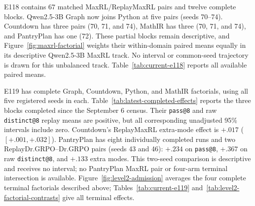 \documentclass{article}
\newcommand{\1}{\mathbf 1}
\theoremstyle{remark}
\theoremstyle{definition}
\theoremstyle{plain}
\begin{document}
E118 contains 67 matched MaxRL/ReplayMaxRL pairs and twelve complete
blocks. Qwen2.5-3B Graph now joins Python at five pairs (seeds 70--74).
Countdown has three pairs (70, 71, and 74), MathIR has three (70, 71, and 74),
and PantryPlan has one (72). These partial blocks remain descriptive,
and Figure~\ref{fig:maxrl-factorial} weights their within-domain paired
means equally in its descriptive Qwen2.5-3B MaxRL track. No interval or
common-seed trajectory is drawn for this unbalanced track.
Table~\ref{tab:current-e118} reports all available paired means.

E119 has complete Graph, Countdown, Python, and MathIR factorials,
using all five registered seeds in each. Table~\ref{tab:latest-completed-effects}
reports the three blocks completed since the September 6 census. Their
\texttt{pass@8} and raw \texttt{distinct@8} replay means are positive, but all
corresponding unadjusted 95\% intervals include zero. Countdown's ReplayMaxRL
extra-mode effect is $+.017$ ($[+.001,+.032]$). PantryPlan has eight
individually completed runs and two ReplayDr.GRPO--Dr.GRPO pairs
(seeds 43 and 46): $+.234$ on \texttt{pass@8}, $+.367$ on raw
\texttt{distinct@8}, and $+.133$ extra modes. This two-seed comparison
is descriptive and receives no interval; no PantryPlan MaxRL pair or
four-arm terminal intersection is available.
Figure~\ref{fig:level2-admission} averages the four complete terminal
factorials described above; Tables~\ref{tab:current-e119}
and~\ref{tab:level2-factorial-contrasts} give all terminal effects.

\begin{table}[H]
  \centering
  \caption{\textbf{Additional complete blocks since the September 6 census.}
  Each contrast uses all five registered paired seeds at pass 8.
  ReplayMaxRL is compared with MaxRL; ReplayDr.GRPO with Dr.GRPO;
  uniform replay with fresh-frequency replay. Entries give paired means and
  nominal 95\% intervals: Student-$t$ for the factorials and exhaustive
  paired percentile bootstrap for the weighting ablation. These intervals
  are not adjusted for repeated looks or multiple comparisons.
  Extra modes are \texttt{distinct@8}$-$\texttt{pass@8} and remain
  coupled to correctness.}
  \label{tab:latest-completed-effects}
  \scriptsize
  \setlength{\tabcolsep}{3pt}
\end{table}
\end{document}
